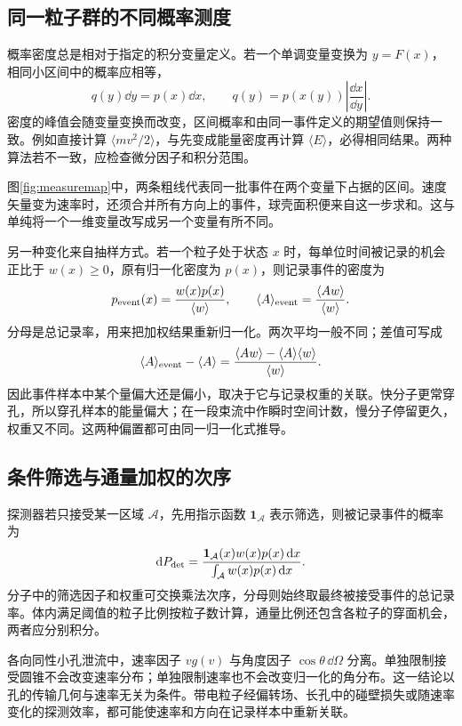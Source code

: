 \subsection{同一粒子群的不同概率测度}
\label{th:samplingmeasure}
概率密度总是相对于指定的积分变量定义。若一个单调变量变换为 $y=F(x)$，相同小区间中的概率应相等，
\[
 q(y)\dd y=p(x)\dd x,\qquad
 q(y)=p(x(y))\left|\frac{\dd x}{\dd y}\right|.
\]
密度的峰值会随变量变换而改变，区间概率和由同一事件定义的期望值则保持一致。例如直接计算 $\langle mv^2/2\rangle$，与先变成能量密度再计算 $\langle E\rangle$，必得相同结果。两种算法若不一致，应检查微分因子和积分范围。

图\ref{fig:measuremap}中，两条粗线代表同一批事件在两个变量下占据的区间。速度矢量变为速率时，还须合并所有方向上的事件，球壳面积便来自这一步求和。这与单纯将一个一维变量改写成另一个变量有所不同。

另一种变化来自抽样方式。若一个粒子处于状态 $x$ 时，每单位时间被记录的机会正比于 $w(x)\ge0$，原有归一化密度为 $p(x)$，则记录事件的密度为
\[
 p_{\rm event}(x)=\frac{w(x)p(x)}{\langle w\rangle},
 \qquad
 \langle A\rangle_{\rm event}
 =\frac{\langle Aw\rangle}{\langle w\rangle}.
\]
分母是总记录率，用来把加权结果重新归一化。两次平均一般不同；差值可写成
\[
 \langle A\rangle_{\rm event}-\langle A\rangle
 =\frac{\langle Aw\rangle-\langle A\rangle\langle w\rangle}
 {\langle w\rangle}.
\]
因此事件样本中某个量偏大还是偏小，取决于它与记录权重的关联。快分子更常穿孔，所以穿孔样本的能量偏大；在一段束流中作瞬时空间计数，慢分子停留更久，权重又不同。这两种偏置都可由同一归一化式推导。

\subsection{条件筛选与通量加权的次序}
探测器若只接受某一区域 $\mathcal A$，先用指示函数 $\mathbf1_{\mathcal A}$ 表示筛选，则被记录事件的概率为
\[
 \mathop{}\!\mathrm d P_{\rm det}=
 \frac{\mathbf1_{\mathcal A}(x)w(x)p(x)\mathop{}\!\mathrm d x}
 {\int_{\mathcal A}w(x)p(x)\mathop{}\!\mathrm d x}.
\]
分子中的筛选因子和权重可交换乘法次序，分母则始终取最终被接受事件的总记录率。体内满足阈值的粒子比例按粒子数计算，通量比例还包含各粒子的穿面机会，两者应分别积分。

各向同性小孔泄流中，速率因子 $vg(v)$ 与角度因子 $\cos\theta\,\dd\Omega$ 分离。单独限制接受圆锥不会改变速率分布；单独限制速率也不会改变归一化的角分布。这一结论以孔的传输几何与速率无关为条件。带电粒子经偏转场、长孔中的碰壁损失或随速率变化的探测效率，都可能使速率和方向在记录样本中重新关联。

